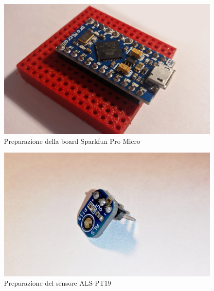 \begin{figure}[H]
	\centering
	\includegraphics[width=\textwidth]{Dispositivo_files/assembly_02.jpg}
	\caption{Preparazione della board Sparkfun Pro Micro}
	\label{fig:assembly_02}
\end{figure}

\begin{figure}[H]
	\centering
	\includegraphics[width=\textwidth]{Dispositivo_files/assembly_03.jpg}
	\caption{Preparazione del sensore ALS-PT19}
	\label{fig:assembly_03}
\end{figure}


